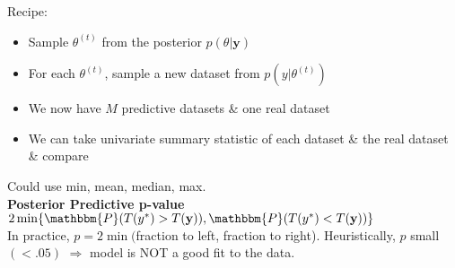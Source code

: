 \documentclass[11pt]{article}
\begin{document}
\noindent Recipe:
\begin{itemize}
\item Sample $\theta^{(t)}$ from the posterior $p(\theta|\mathbf{y})$
\item For each $\theta^{(t)}$, sample a new dataset from $p(y|\theta^{(t)})$
\item We now have $M$ predictive datasets \& one real dataset
\item We can take univariate summary statistic of each dataset \& the real dataset \& compare
\end{itemize}
Could use min, mean, median, max.\\

\noindent\textbf{Posterior Predictive p-value}\\
$2\min\{\mathbbm{P}(T(y^*)>T(\mathbf{y})),\mathbbm{P}(T(y^*)<T(\mathbf{y}))\}$\\
In practice, $p=2\min($fraction to left, fraction to right). Heuristically, $p$ small $(<.05)$ $\Rightarrow$ model is NOT a good fit to the data.
\end{document}
